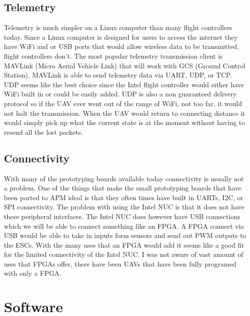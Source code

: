 \documentclass[letterpaper,10pt,notitlepage,fleqn]{article}
\begin{document}
\subsection{Telemetry}
\indent Telemetry is much simpler on a Linux computer than many flight controllers today. Since a Linux computer is designed for users to access the internet they have WiFi and or USB ports that would allow wireless data to be transmitted, flight controllers don't. The most popular telemetry transmission client is MAVLink (Micro Aerial Vehicle Link) that will work with GCS (Ground Control Station). MAVLink is able to send telemetry data via UART, UDP, or TCP. UDP
seems like the best choice since the Intel flight controller would either have WiFi built in or  could be easily added. UDP is also a non guaranteed delivery protocol so if the UAV ever went out of the range of WiFi, not too far, it would not halt the transmission. When the UAV would return to connecting distance it would simply pick up what the current state is at the moment without having to resend all the lost packets.

\subsection{Connectivity}
\indent With many of the prototyping boards available today connectivity is usually not a problem. One of the things that make the small prototyping boards that have been ported to APM ideal is that they often times have built in UARTs, I2C, or SPI connectivity. The problem with using the Intel NUC is that it does not have these peripheral interfaces. The Intel NUC does however have USB connections which we will be able to connect something like an FPGA. A FPGA connect
via USB would be able to take in inputs form sensors and send out PWM outputs to the ESCs. With the many uses that an FPGA would add it seems like a good fit for the limited connectivity of the Intel NUC. I was not aware of vast amount of uses that FPGAs offer, there have been UAVs that have been fully programed with only a FPGA.

\section{Software}
\end{document}

